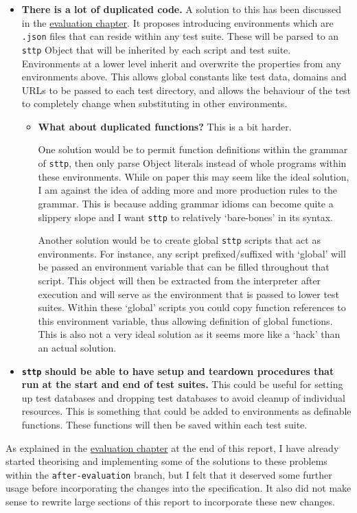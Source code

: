 \begin{itemize}
    \item \textbf{There is a lot of duplicated code.} A solution to this has been discussed in the \hyperref[sec:evaluation-environments]{evaluation chapter}. It proposes introducing environments which are \verb|.json| files that can reside within any test suite. These will be parsed to an \verb|sttp| Object that will be inherited by each script and test suite. Environments at a lower level inherit and overwrite the properties from any environments above. This allows global constants like test data, domains and URLs to be passed to each test directory, and allows the behaviour of the test to completely change when substituting in other environments.
    \begin{itemize}
        \item \textbf{What about duplicated functions?} This is a bit harder.
        
        One solution would be to permit function definitions within the grammar of \verb|sttp|, then only parse Object literals instead of whole programs within these environments. While on paper this may seem like the ideal solution, I am against the idea of adding more and more production rules to the grammar. This is because adding grammar idioms can become quite a slippery slope and I want \verb|sttp| to relatively `bare-bones' in its syntax.

        Another solution would be to create global \verb|sttp| scripts that act as environments. For instance, any script prefixed/suffixed with `global' will be passed an environment variable that can be filled throughout that script. This object will then be extracted from the interpreter after execution and will serve as the environment that is passed to lower test suites. Within these `global' scripts you could copy function references to this environment variable, thus allowing definition of global functions. This is also not a very ideal solution as it seems more like a `hack' than an actual solution.
    \end{itemize}
    \item \textbf{\texttt{sttp} should be able to have setup and teardown procedures that run at the start and end of test suites.} This could be useful for setting up test databases and dropping test databases to avoid cleanup of individual resources. This is something that could be added to environments as definable functions. These functions will then be saved within each test suite.
\end{itemize}

As explained in the \hyperref[chap:evaluation]{evaluation chapter} at the end of this report, I have already started theorising and implementing some of the solutions to these problems within the \verb|after-evaluation| branch, but I felt that it deserved some further usage before incorporating the changes into the specification. It also did not make sense to rewrite large sections of this report to incorporate these new changes.
